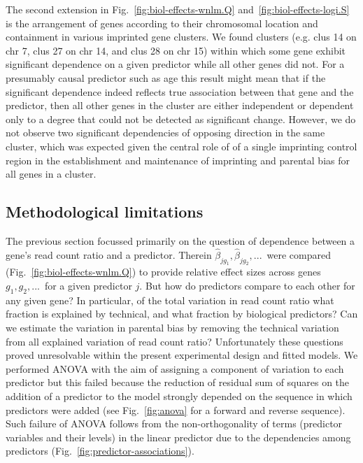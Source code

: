 \documentclass[letterpaper]{article}
\begin{document}
The second extension in Fig.~\ref{fig:biol-effects-wnlm.Q}
and~\ref{fig:biol-effects-logi.S} is the arrangement of genes according to
their chromosomal location and containment in various imprinted gene clusters.
We found clusters (e.g. clus 14 on chr 7, clus 27 on chr 14, and clus 28 on
chr 15) within which some gene exhibit significant dependence on a given
predictor while all other genes did not. For a presumably causal predictor such
as age this result might mean that if the significant dependence indeed
reflects true association between that gene and the predictor, then all other
genes in the cluster are either independent or dependent only to a degree that
could not be detected as significant change. However, we do not observe two
significant dependencies of opposing direction in the same cluster, which was
expected given the central role of of a single imprinting control region in
the establishment and maintenance of imprinting and parental bias for all
genes in a cluster.

\subsection{Methodological limitations}
\label{sec:limitations}

The previous section focussed primarily on the question of dependence between
a gene's read count ratio and a predictor.  Therein \(\hat\beta_{jg_1},
\hat\beta_{jg_2},...\)~were compared (Fig.~\ref{fig:biol-effects-wnlm.Q}) to
provide relative effect sizes across genes \(g_1, g_2,...\)~for a given
predictor \(j\). But how do predictors compare to each other for any given
gene? In particular, of the total variation in read count ratio what fraction
is explained by technical, and what fraction by biological predictors? Can we
estimate the variation in parental bias by removing the technical variation
from all explained variation of read count ratio?  Unfortunately these
questions proved unresolvable within the present experimental design and
fitted models. We performed ANOVA with the aim of assigning a component of
variation to each predictor but this failed because the reduction of residual
sum of squares on the addition of a predictor to the model strongly depended
on the sequence in which predictors were added (see Fig.~\ref{fig:anova} for a
forward and reverse sequence). Such failure of ANOVA follows from
the non-orthogonality of terms (predictor variables and their levels) in the
linear predictor due to the dependencies among predictors
(Fig.~\ref{fig:predictor-associations}).
\end{document}
